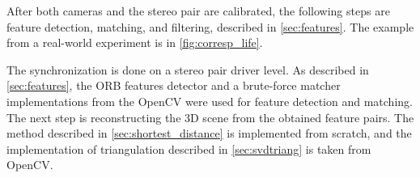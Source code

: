After both cameras and the stereo pair are calibrated, the following steps are feature detection, matching, and filtering, described in \autoref{sec:features}.
The example from a real-world experiment is in \autoref{fig:corresp_life}.

The synchronization is done on a stereo pair driver level.
As described in \autoref{sec:features}, the ORB features detector and a brute-force matcher implementations from the OpenCV were used for feature detection and matching.
The next step is reconstructing the 3D scene from the obtained feature pairs.
The method described in \autoref{sec:shortest_distance} is implemented from scratch, and the implementation of triangulation described in \autoref{sec:svdtriang} is taken from OpenCV.